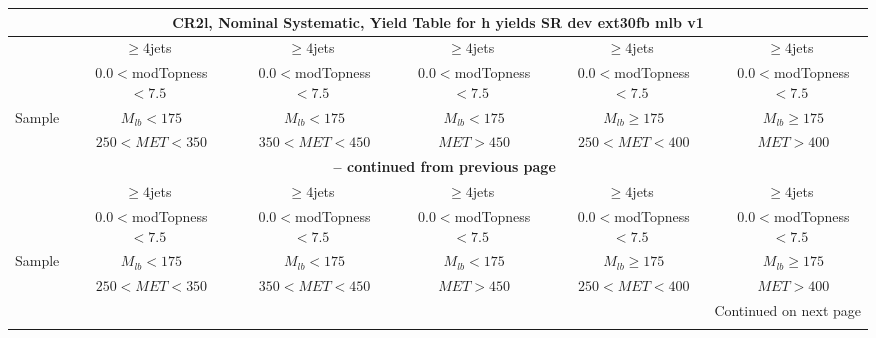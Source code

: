 \documentclass{article}
\begin{document}
\begin{longtable}{|l|c|c|c|c|c|} 
 
\multicolumn{6}{c}{ CR2l, Nominal Systematic, Yield Table for h yields SR dev ext30fb mlb v1 }\\* \hline 
  & $\ge4$jets  & $\ge4$jets  & $\ge4$jets  & $\ge4$jets  & $\ge4$jets \\* 
  & ~$0.0<$modTopness$<7.5$  & ~$0.0<$modTopness$<7.5$  & ~$0.0<$modTopness$<7.5$  & ~$0.0<$modTopness$<7.5$  & ~$0.0<$modTopness$<7.5$ \\* 
Sample  & ~$M_{lb}<175$  & ~$M_{lb}<175$  & ~$M_{lb}<175$  & ~$M_{lb}\ge175$  & ~$M_{lb}\ge175$ \\* 
  & ~$250<MET<350$  & ~$350<MET<450$  & ~$MET>450$  & ~$250<MET<400$  & ~$MET>400$ \\* 
\hline \hline 
\endfirsthead 
 
\multicolumn{6}{c}{{\bfseries \tablename\ \thetable{} -- continued from previous page}}\\* \hline 
  & $\ge4$jets  & $\ge4$jets  & $\ge4$jets  & $\ge4$jets  & $\ge4$jets \\* 
  & ~$0.0<$modTopness$<7.5$  & ~$0.0<$modTopness$<7.5$  & ~$0.0<$modTopness$<7.5$  & ~$0.0<$modTopness$<7.5$  & ~$0.0<$modTopness$<7.5$ \\* 
Sample  & ~$M_{lb}<175$  & ~$M_{lb}<175$  & ~$M_{lb}<175$  & ~$M_{lb}\ge175$  & ~$M_{lb}\ge175$ \\* 
  & ~$250<MET<350$  & ~$350<MET<450$  & ~$MET>450$  & ~$250<MET<400$  & ~$MET>400$ \\* 
\hline \hline 
\endhead 
 
\multicolumn{6}{|r|}{{Continued on next page}}\\* \hline 
\endfoot 
 
 
\endlastfoot 
 

\end{longtable}
\end{document}
